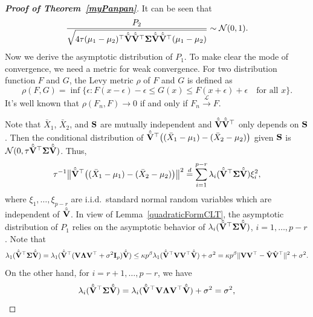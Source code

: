 \documentclass[times,sort&compress,3p]{elsarticle}
\theoremstyle{plain}
\theoremstyle{definition}
\theoremstyle{remark}
\begin{document}
\begin{appendices}
\begin{proof}[\textbf{Proof of Theorem~\ref{myPanpan}}]
   It can be seen that
   $$
   \frac{P_2}{\sqrt{4\tau (\mu_1-\mu_2)^\top  \hat{\tilde{\mathbf{V}}}\hat{\tilde{\mathbf{V}}}^\top  \boldsymbol{\Sigma}\hat{\tilde{\mathbf{V}}}\hat{\tilde{\mathbf{V}}}^\top  (\mu_1-\mu_2)}} \sim \mathcal{N}(0,1).
   $$
    Now we derive the asymptotic distribution of $P_1$.
    To make clear the mode of convergence, we need a metric for weak convergence. For two distribution function $F$ and $G$, the Levy metric $\rho$ of $F$ and $G$ is defined as
    $$
   \rho(F,G) =\inf\{\epsilon:F(x-\epsilon)-\epsilon\leq G(x)\leq F(x+\epsilon)+\epsilon\quad \textrm{for all $x$}\}.
    $$
    It's well known that $\rho(F_n,F)\to 0$ if and only if $F_n\xrightarrow{\mathcal{L}}F$.


    Note that $\bar{X}_1$, $\bar{X}_2$, and $\mathbf{S}$ are mutually independent and $\hat{\tilde{\mathbf{V}}}\hat{\tilde{\mathbf{V}}}^\top $ only depends on $\mathbf{S}$.
    Then the conditional distribution of
    $\hat{\tilde{\mathbf{V}}}^\top \big((\bar{X}_1-\mu_1)-(\bar{X}_2-\mu_2)\big)$ given $\mathbf{S}$ is $\mathcal{N}(0,\tau \hat{\tilde{\mathbf{V}}}^\top \boldsymbol{\Sigma}\hat{\tilde{\mathbf{V}}})$.
    Thus,
\begin{equation}\label{houjia2}
\tau^{-1}\big\|\hat{\tilde{\mathbf{V}}}^\top \big((\bar{X}_1-\mu_1)-(\bar{X}_2-\mu_2)\big)\big\|^2
    \overset{d}{=}
    \sum_{i=1}^{p-r} \lambda_i(\hat{\tilde{\mathbf{V}}}^\top \boldsymbol{\Sigma}\hat{\tilde{\mathbf{V}}})\xi_i^2,
\end{equation}
where $\xi_1,\ldots,\xi_{p-r}$ are i.i.d.\  standard normal random variables which are independent of $\hat{\tilde{\mathbf{V}}}$.
    In view of Lemma~\ref{quadraticFormCLT}, the asymptotic distribution of $P_1$ relies on the asymptotic behavior of $\lambda_i(\hat{\tilde{\mathbf{V}}}^\top \boldsymbol{\Sigma}\hat{\tilde{\mathbf{V}}})$, $i=1,\ldots, p-r$.
     Note that
     \begin{equation}\label{houjia1}
     \lambda_1(\hat{\tilde{\mathbf{V}}}^\top \boldsymbol{\Sigma}\hat{\tilde{\mathbf{V}}})
             =
             \lambda_1(\hat{\tilde{\mathbf{V}}}^\top  (\mathbf{V}\boldsymbol{\Lambda} \mathbf{V}^\top  +\sigma^2 \mathbf{I}_p) \hat{\tilde{\mathbf{V}}})
         \leq 
     \kappa p^{\beta}\lambda_1(\hat{\tilde{\mathbf{V}}}^\top  \mathbf{V} \mathbf{V}^\top \hat{\tilde{\mathbf{V}}})+\sigma^2
     =
    \kappa p^\beta \|\mathbf{V}\mathbf{V}^\top  -\hat{\mathbf{V}}\hat{\mathbf{V}}^\top \|^2+\sigma^2.
     \end{equation}
    On the other hand,
    for $i=r+1,\ldots,p-r$,
    we have
    \begin{equation}\label{houjia3}
    \lambda_i(\hat{\tilde{\mathbf{V}}}^\top \boldsymbol{\Sigma}\hat{\tilde{\mathbf{V}}})
    =
    \lambda_i(\hat{\tilde{\mathbf{V}}}^\top  \mathbf{V} \boldsymbol{\Lambda} \mathbf{V}^\top  \hat{\tilde{\mathbf{V}}})+\sigma^2
    =\sigma^2,
    \end{equation}

\end{proof}
\end{appendices}
\end{document}
